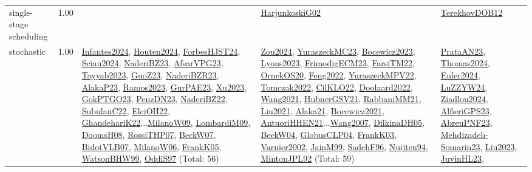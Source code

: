 {\begin{longtable}{p{3cm}r>{\raggedright\arraybackslash}p{6cm}>{\raggedright\arraybackslash}p{6cm}>{\raggedright\arraybackslash}p{8cm}}
\index{single-stage scheduling}\index{Concepts!single-stage scheduling}single-stage scheduling &  1.00 &  & \hyperref[detail:HarjunkoskiG02]{HarjunkoskiG02} & \hyperref[detail:TerekhovDOB12]{TerekhovDOB12}\\
\index{stochastic}\index{Concepts!stochastic}stochastic &  1.00 & \hyperref[detail:Infantes2024]{Infantes2024}, \hyperref[detail:Houten2024]{Houten2024}, \hyperref[detail:ForbesHJST24]{ForbesHJST24}, \hyperref[detail:Sciau2024]{Sciau2024}, \hyperref[detail:NaderiBZ23]{NaderiBZ23}, \hyperref[detail:AfsarVPG23]{AfsarVPG23}, \hyperref[detail:Tayyab2023]{Tayyab2023}, \hyperref[detail:GuoZ23]{GuoZ23}, \hyperref[detail:NaderiBZR23]{NaderiBZR23}, \hyperref[detail:AlakaP23]{AlakaP23}, \hyperref[detail:Ramos2023]{Ramos2023}, \hyperref[detail:GurPAE23]{GurPAE23}, \hyperref[detail:Xu2023]{Xu2023}, \hyperref[detail:GokPTGO23]{GokPTGO23}, \hyperref[detail:PenzDN23]{PenzDN23}, \hyperref[detail:NaderiBZ22]{NaderiBZ22}, \hyperref[detail:SubulanC22]{SubulanC22}, \hyperref[detail:ElciOH22]{ElciOH22}, \hyperref[detail:GhandehariK22]{GhandehariK22}...\hyperref[detail:MilanoW09]{MilanoW09}, \hyperref[detail:LombardiM09]{LombardiM09}, \hyperref[detail:DoomsH08]{DoomsH08}, \hyperref[detail:RossiTHP07]{RossiTHP07}, \hyperref[detail:BeckW07]{BeckW07}, \hyperref[detail:BidotVLB07]{BidotVLB07}, \hyperref[detail:MilanoW06]{MilanoW06}, \hyperref[detail:FrankK05]{FrankK05}, \hyperref[detail:WatsonBHW99]{WatsonBHW99}, \hyperref[detail:OddiS97]{OddiS97} (Total: 56) & \hyperref[detail:Zou2024]{Zou2024}, \hyperref[detail:YuraszeckMC23]{YuraszeckMC23}, \hyperref[detail:Bocewicz2023]{Bocewicz2023}, \hyperref[detail:Lyons2023]{Lyons2023}, \hyperref[detail:FrimodigECM23]{FrimodigECM23}, \hyperref[detail:FarsiTM22]{FarsiTM22}, \hyperref[detail:OrnekOS20]{OrnekOS20}, \hyperref[detail:Feng2022]{Feng2022}, \hyperref[detail:YuraszeckMPV22]{YuraszeckMPV22}, \hyperref[detail:Tomczak2022]{Tomczak2022}, \hyperref[detail:CilKLO22]{CilKLO22}, \hyperref[detail:Doolaard2022]{Doolaard2022}, \hyperref[detail:Wang2021]{Wang2021}, \hyperref[detail:HubnerGSV21]{HubnerGSV21}, \hyperref[detail:RabbaniMM21]{RabbaniMM21}, \hyperref[detail:Liu2021]{Liu2021}, \hyperref[detail:Alaka21]{Alaka21}, \hyperref[detail:Bocewicz2021]{Bocewicz2021}, \hyperref[detail:AntuoriHHEN21]{AntuoriHHEN21}...\hyperref[detail:Wang2007]{Wang2007}, \hyperref[detail:DilkinaDH05]{DilkinaDH05}, \hyperref[detail:BeckW04]{BeckW04}, \hyperref[detail:GlobusCLP04]{GlobusCLP04}, \hyperref[detail:FrankK03]{FrankK03}, \hyperref[detail:Varnier2002]{Varnier2002}, \hyperref[detail:JainM99]{JainM99}, \hyperref[detail:SadehF96]{SadehF96}, \hyperref[detail:Nuijten94]{Nuijten94}, \hyperref[detail:MintonJPL92]{MintonJPL92} (Total: 59) & \hyperref[detail:PrataAN23]{PrataAN23}, \hyperref[detail:Thomas2024]{Thomas2024}, \hyperref[detail:Euler2024]{Euler2024}, \hyperref[detail:LuZZYW24]{LuZZYW24}, \hyperref[detail:Ziadlou2024]{Ziadlou2024}, \hyperref[detail:AlfieriGPS23]{AlfieriGPS23}, \hyperref[detail:AbreuPNF23]{AbreuPNF23}, \hyperref[detail:Mehdizadeh-Somarin23]{Mehdizadeh-Somarin23}, \hyperref[detail:Liu2023]{Liu2023}, \hyperref[detail:JuvinHL23]{JuvinHL23}, 
\end{longtable}}
